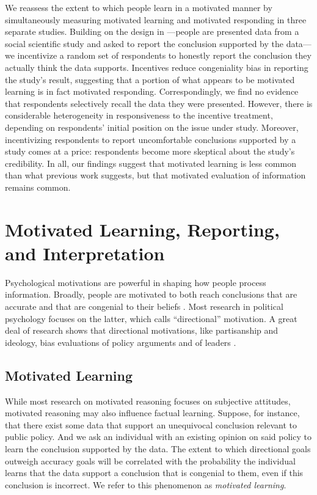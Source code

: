 \documentclass[12pt, letterpaper]{article}
\begin{document}
We reassess the extent to which people learn in a motivated manner by simultaneously measuring motivated learning and motivated responding in three separate studies. Building on the design in \citet{kahan2017}---people are presented data from a social scientific study and asked to report the conclusion supported by the data---we incentivize a random set of respondents to honestly report the conclusion they actually think the data supports. Incentives reduce congeniality bias in reporting the study's result, suggesting that a portion of what appears to be motivated learning is in fact motivated responding. Correspondingly, we find no evidence that respondents selectively recall the data they were presented. However, there is considerable heterogeneity in responsiveness to the incentive treatment, depending on respondents' initial position on the issue under study. Moreover, incentivizing respondents to report uncomfortable conclusions supported by a study comes at a price: respondents become more skeptical about the study's credibility. In all, our findings suggest that motivated learning is less common than what previous work suggests, but that motivated evaluation of information remains common.

\section*{Motivated Learning, Reporting, and Interpretation}

Psychological motivations are powerful in shaping how people process information. Broadly, people are motivated to both reach conclusions that are accurate and that are congenial to their beliefs \citep[see][]{kunda1990}. Most research in political psychology focuses on the latter, which \citeauthor{kunda1990} calls ``directional'' motivation. A great deal of research shows that directional motivations, like partisanship and ideology, bias evaluations of policy arguments \citep[e.g.,][]{lord1979, taber2006, bolsen2014} and of leaders \citep[e.g.,][]{bartels2002, lebo2007, kim2010}.

\subsection*{Motivated Learning}
While most research on motivated reasoning focuses on subjective attitudes, motivated reasoning may also influence factual learning. Suppose, for instance, that there exist some data that support an unequivocal conclusion relevant to public policy. And we ask an individual with an existing opinion on said policy to learn the conclusion supported by the data. The extent to which directional goals outweigh accuracy goals will be correlated with the probability the individual learns that the data support a conclusion that is congenial to them, even if this conclusion is incorrect. We refer to this phenomenon as {\it motivated learning}.
\end{document}

